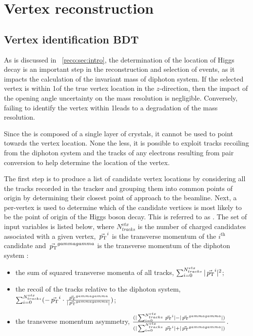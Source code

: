 \section{Vertex reconstruction}
\label{reco:sec:vertex}

\subsection{Vertex identification BDT}
As is discussed in \Sec~\ref{reco:sec:intro}, the determination of the location of Higgs decay is an important step in the reconstruction and selection of \Hgg events, as it impacts the calculation of the invariant mass of diphoton system. If the selected vertex is within 1\cm of the true vertex location in the $z$-direction, then the impact of the opening angle uncertainty on the mass resolution is negligible. Conversely, failing to identify the vertex within 1\cm leads to a degradation of the mass resolution. %

Since the \CMS \ECAL is composed of a single layer of crystals, it cannot be used to point towards the vertex location. %
None the less, it is possible to exploit tracks recoiling from the diphoton system and the tracks of any electrons resulting from pair conversion to help determine the location of the vertex.

The first step is to produce a list of candidate vertex locations by considering all the tracks recorded in the tracker and grouping them into common points of origin by determining their closest point of approach to the beamline. Next, a per-vertex \BDT is used to determine which of the candidate vertices is most likely to be the point of origin of the Higgs boson decay. This \BDT is referred to as \VtxIdBdt. The set of input variables is listed below, where $N_{tracks}^{vtx}$ is the number of charged \PF candidates associated with a given vertex, $\vec{\,p_\text{T}}^i$ is the transverse momentum of the $i^{\textrm{th}}$ candidate and $\vec{\,p_\text{T}}^{gammagamma}$ is the transverse momentum of the diphoton system :
\begin{itemize}
\item the sum of squared transverse momenta of all tracks, $\sum_{i=0}^{N_{tracks}^{vtx}} | \vec{\,p_\text{T}}^{i} |^2$;
\item the recoil of the tracks relative to the diphoton system,  $\sum_{i=0}^{N_{tracks}^{vtx}} (- \vec{\,p_\text{T}}^i \cdot \frac{\vec{\,p_\text{T}}^{gammagamma}}{|\vec{\,p_\text{T}}^{gammagamma}| })$;
\item the transverse momentum asymmetry,  $\frac{(|\sum_{i=0}^{N_{tracks}^{vtx}} \vec{\,p_\text{T}}^i| - |\vec{\,p_\text{T}}^{gammagamma}|)}{(|\sum_{i=0}^{N_{tracks}^{vtx}} \vec{\,p_\text{T}}^i| + |\vec{\,p_\text{T}}^{gammagamma}|)}$.
\end{itemize}

